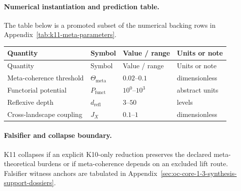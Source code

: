 \paragraph{Numerical instantiation and prediction table.}
The table below is a promoted subset of the numerical backing rows in Appendix~\ref{tab:k11-meta-parameters}.
\begin{longtable}{@{}L{0.27\textwidth}L{0.15\textwidth}L{0.24\textwidth}L{0.16\textwidth}@{}}
\toprule
Quantity & Symbol & Value / range & Units or note \\
\midrule
\endfirsthead
\toprule
Quantity & Symbol & Value / range & Units or note \\
\midrule
\endhead
Meta-coherence threshold & $\scriptstyle \Theta_{\mathrm{meta}}$ & $0.02\text{--}0.1$ & dimensionless \\
Functorial potential & $\scriptstyle P_{\mathrm{funct}}$ & $10^0\text{--}10^3$ & abstract units \\
Reflexive depth & $\scriptstyle d_{\mathrm{refl}}$ & $3\text{--}50$ & levels \\
Cross-landscape coupling & $\scriptstyle J_X$ & $0.1\text{--}1$ & dimensionless \\
\bottomrule
\end{longtable}

\paragraph{Falsifier and collapse boundary.}
K11 collapses if an explicit K10-only reduction preserves the declared meta-theoretical burdens or if meta-coherence depends on an excluded lift route.
Falsifier witness anchors are tabulated in Appendix~\ref{sec:oc-core-1-3-synthesis-support-dossiers}.

